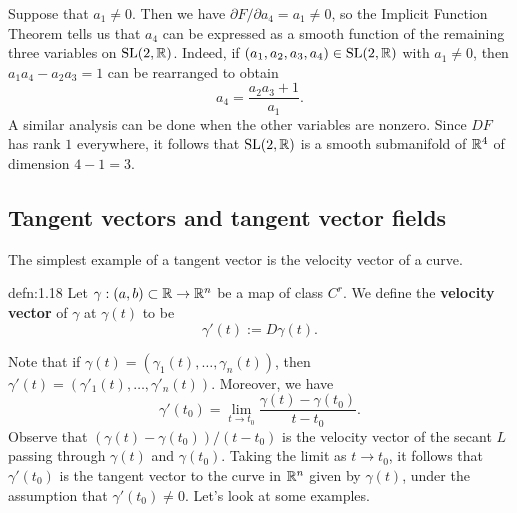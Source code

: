 Suppose that $a_1 \neq 0$. Then we have $\partial F/\partial a_4 = a_1 \neq 0$, 
so the Implicit Function Theorem tells us that $a_4$ can be expressed as a 
smooth function of the remaining three variables on $\operatorname{SL}(2, \mathbb{R})$. Indeed, if 
$(a_1, a_2, a_3, a_4) \in \operatorname{SL}(2, \mathbb{R})$ with $a_1 \neq 0$, then 
$a_1a_4 - a_2a_3 = 1$ can be rearranged to obtain 
\[ a_4 = \frac{a_2a_3 + 1}{a_1}. \] 
A similar analysis can be done when the other variables are nonzero. 
Since $DF$ has rank $1$ everywhere, it follows that $\operatorname{SL}(2, \mathbb{R})$ is a 
smooth submanifold of $\mathbb{R}^4$ of dimension $4-1 = 3$. 

\subsection{Tangent vectors and tangent vector fields} \label{subsec:1.5}
The simplest example of a tangent vector is the velocity vector of a curve. 

\begin{defn}{defn:1.18}
    Let $\gamma : (a, b) \subset \mathbb{R} \to \mathbb{R}^n$ be a map of class $C^r$. 
    We define the {\bf velocity vector} of $\gamma$ at $\gamma(t)$ to be 
    \[ \gamma'(t) := D\gamma(t). \] 
\end{defn}\vspace{-0.25cm}

Note that if $\gamma(t) = (\gamma_1(t), \dots, \gamma_n(t))$, then 
$\gamma'(t) = (\gamma'_1(t), \dots, \gamma'_n(t))$. Moreover, we have 
\[ \gamma'(t_0) = \lim_{t\to t_0} \frac{\gamma(t) - \gamma(t_0)}{t - t_0}. \] 
Observe that $(\gamma(t) - \gamma(t_0))/(t - t_0)$ is the velocity vector 
of the secant $L$ passing through $\gamma(t)$ and $\gamma(t_0)$. 
Taking the limit as $t \to t_0$, it follows that $\gamma'(t_0)$ is the tangent 
vector to the curve in $\mathbb{R}^n$ given by $\gamma(t)$, under the assumption
that $\gamma'(t_0) \neq 0$. Let's look at some examples. 

